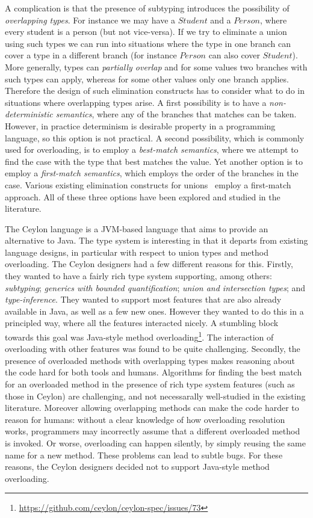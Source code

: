 A complication is that the presence of subtyping introduces the
possibility of \emph{overlapping types}. For instance we may have a
$Student$ and a $Person$, where every student is a person (but not
vice-versa). If we try to eliminate a union using such types we can
run into situations where the type in one branch can cover a type in a
different branch (for instance $Person$ can also cover
$Student$). More generally, types can \emph{partially overlap}
and for some values two branches with such types can apply, whereas
for some other values only one branch applies.
Therefore the design of such elimination constructs has to
consider what to do in situations where overlapping types arise.  A
first possibility is to have a \emph{non-deterministic semantics},
where any of the branches that matches can be taken. However, in
practice determinism is desirable property in a programming language,
so this option is not practical. A second possibility, which is
commonly used for overloading, is to employ a \emph{best-match
  semantics}, where we attempt to find the case with the type that
best matches the value. Yet another option is to employ a
\emph{first-match semantics}, which employs the order of the branches
in the case. Various existing elimination constructs for unions~\cite{}
employ a first-match approach. All of these three options have been explored
and studied in the literature. 

The Ceylon language is a JVM-based language that aims to provide an
alternative to Java. The type system is interesting
in that it departs from existing language designs, in particular
with respect to union types and method overloading.
The Ceylon designers had a few different
reasons for this. Firstly, they wanted to have a fairly rich type system
supporting, among others: \emph{subtyping}; \emph{generics with bounded
quantification}; \emph{union and intersection types}; and \emph{type-inference}.
They wanted to support most features that are also already available
in Java, as well as a few new ones. However they wanted to do this in
a principled way, where all the features interacted nicely.  A
stumbling block towards this goal was Java-style method
overloading\footnote{\url{https://github.com/ceylon/ceylon-spec/issues/73}}.
The interaction of overloading with other
features was found to be quite challenging. Secondly, the presence of
overloaded methods with overlapping types
makes reasoning about the code hard 
for both tools and humans. Algorithms for finding the best match for an
overloaded method in the presence of rich type system features (such as
those in Ceylon) are challenging, and not necessarally well-studied in the
existing literature. Moreover allowing overlapping methods can make
the code harder to reason for humans: without a clear knowledge of how
overloading resolution works, programmers may incorrectly assume that
a different overloaded method is invoked. Or worse, overloading can
happen silently, by simply reusing the same name for a new
method. These problems can lead to subtle bugs.
For these reasons, the Ceylon designers decided not to support
Java-style method overloading.

